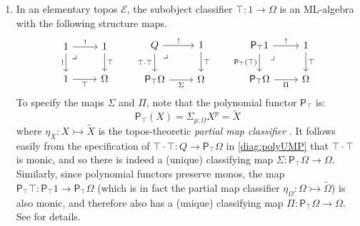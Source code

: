 \documentclass[12pt,reqno]{amsart}
\newcommand{\EE}{\ensuremath{\mathcal{E}}}
\newcommand{\alg}[1]{\ensuremath{\mathsf{#1}}}
\newcommand{\mono}{\ensuremath{\rightarrowtail}}
\renewcommand{\to}{\ensuremath{\rightarrow}}
\newcommand{\pbcorner}{\arrow[dr,phantom,"\lrcorner" very near start, shift right=.5ex]} %
\theoremstyle{remark}
\theoremstyle{definition}
\begin{document}
\begin{enumerate}
\item In an elementary topos $\EE$, the subobject classifier $\top : 1\to \Omega$ is an ML-algebra with the following structure maps.
\begin{equation*}\label{diag:MLalg}
\begin{tikzcd}
	1 \ar[r,"!"] \ar[d,swap,"!"] \pbcorner & 1 \ar[d, "\top"]\\  
	1 \ar[r, swap,"\top"] & \Omega
 \end{tikzcd}\qquad 
 \begin{tikzcd}
	Q  \ar[r,"!"] \ar[d,swap,"{\top\cdot\top}"] \pbcorner &  1 \ar[d, "\top"]\\  
	\alg{P}_\top\Omega \ar[r,swap, "\Sigma"] & \Omega
\end{tikzcd} \qquad 
	 \begin{tikzcd}
	\alg{P}_{\top}1 \ar[d,swap,"\alg{P}_{\top}(\top)"] \ar[r,"!"] \pbcorner &  1 \ar[d, "\top"]\\  
	\alg{P}_{\top}\Omega \ar[r,swap, "\Pi"] & \Omega
 \end{tikzcd} 
 \end{equation*}
To specify the maps $\Sigma$ and $\Pi$, note that the polynomial functor $\alg{P}_\top$ is:
 \[
 \alg{P}_\top(X) = \Sigma_{p:\Omega}X^p = \widetilde{X}
 \]
where $\eta_X : X \mono \widetilde{X}$ is the topos-theoretic \emph{partial map classifier} \cite[Proposition A.2.4.7]{Johnstone:Elephant}. 
It follows easily from the specification of $\top\cdot\top : Q \to \alg{P}_\top\Omega$ in \eqref{diag:polyUMP} that $\top\cdot\top$ is monic, and so there is indeed a (unique) classifying map $\Sigma : \alg{P}_{\top}\Omega \to \Omega$.   Similarly, since polynomial functors preserve monos, the map $\alg{P}_{\top}\top : \alg{P}_{\top}1 \to \alg{P}_{\top}\Omega$ (which is in fact the partial map classifier $\eta_\Omega : \Omega \mono \widetilde{\Omega}$) is also monic, and therefore also has a (unique) classifying map  $\Pi :\alg{P}_{\top}\Omega \to \Omega$.  See \cite[\S 6]{AGH} for details. 


\end{enumerate}
\end{document}
